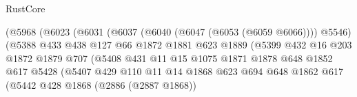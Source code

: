 \begin{lexlean}{RustCore}
\begin{coremodule}
                                        (@5968
                                          (@6023
                                            (@6031
                                              (@6037 (@6040 (@6047 (@6053 (@6059 @6066)))) @5546)
                                              (@5388
                                                @433
                                                @438
                                                @127
                                                @66
                                                @1872
                                                @1881
                                                @623
                                                @1889
                                                (@5399
                                                  @432
                                                  @16
                                                  @203
                                                  @1872
                                                  @1879
                                                  @707
                                                  (@5408
                                                    @431
                                                    @11
                                                    @15
                                                    @1075
                                                    @1871
                                                    @1878
                                                    @648
                                                    @1852
                                                    @617
                                                    @5428
                                                    (@5407
                                                      @429
                                                      @110
                                                      @11
                                                      @14
                                                      @1868
                                                      @623
                                                      @694
                                                      @648
                                                      @1862
                                                      @617
                                                      (@5442
                                                        @428
                                                        @1868
                                                        (@2886 (@2887 @1868))

\end{coremodule}
\end{lexlean}

